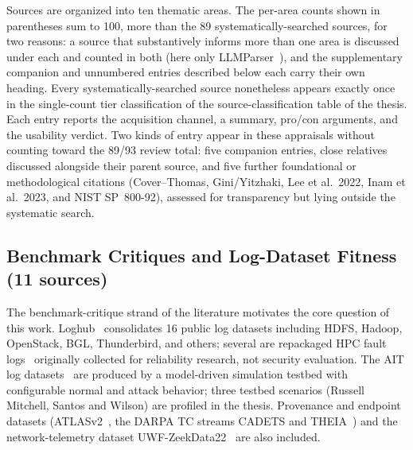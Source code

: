 
Sources are organized into ten thematic areas. The per-area counts shown
in parentheses sum to 100, more than the 89 systematically-searched sources,
for two reasons: a source that substantively informs more than one area is
discussed under each and counted in both (here only LLMParser~\cite{llmparser}), and the
supplementary companion and unnumbered entries described below each carry
their own heading. Every systematically-searched source nonetheless appears
exactly once in the single-count tier classification of
the source-classification table of the thesis. Each
entry reports the acquisition channel, a summary, pro/con arguments, and
the usability verdict. Two kinds of entry appear in these appraisals
without counting toward the 89/93 review total: five companion entries,
close relatives discussed alongside their parent
source, and five further foundational or methodological citations
(Cover--Thomas, Gini/Yitzhaki, Lee et al.\ 2022, Inam et al.\ 2023, and
NIST SP~800-92), assessed for transparency but lying outside the
systematic search.

\subsection{Benchmark Critiques and Log-Dataset Fitness (11 sources)}
\label{sec:bg-landscape}

The benchmark-critique strand of the literature motivates the core 
question of this work. Loghub~\cite{loghub2023} consolidates 16 public log
datasets including HDFS, Hadoop, OpenStack, BGL, Thunderbird, and
others; several are repackaged HPC fault logs~\cite{oliner2007,%
schroeder2006} originally collected for reliability research, not
security evaluation. The AIT log datasets~\cite{ait2021have,%
ait2023maintainable} are produced by a model-driven simulation testbed
with configurable normal and attack behavior; three testbed
scenarios (Russell Mitchell, Santos and Wilson) are profiled in the thesis.
Provenance and endpoint datasets (ATLASv2~\cite{atlasv2}, the DARPA
TC streams CADETS and THEIA~\cite{darpa-tc-e3}) and the network-telemetry dataset
UWF-ZeekData22~\cite{uwfzeek22} are also included.

